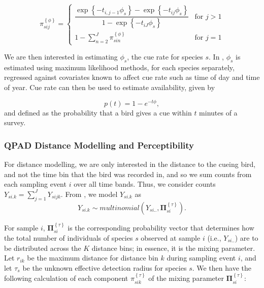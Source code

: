 \documentclass[12pt]{article}
\begin{document}
\begin{equation}\label{eq:removal}
	\pi_{sij}^{\left\{\phi\right\}} = 
	\begin{cases}
		\dfrac{\exp\left\{ -t_{i,j-1}\phi_{s} \right\} - \exp\left\{ -t_{ij}\phi_{s} \right\}}{1 - \exp\left\{ -t_{iJ}\phi_{s} \right\}} & \text{for } j > 1 \\
		1 - \sum_{n = 2}^{J} \pi_{sin}^{\left\{\phi\right\}} & \text{for } j = 1
	\end{cases}
\end{equation}

\par We are then interested in estimating $\phi_s$, the cue rate for species $s$.
In \citep{solymos_calibrating_2013}, $\phi_s$ is estimated using maximum likelihood methods, for each species separately, regressed against covariates known to affect cue rate such as time of day and time of year.
Cue rate can then be used to estimate availability, given by

\begin{equation}\label{eq:availability}
	p(t) = 1 - e^{-t\phi},
\end{equation}
and defined as the probability that a bird gives a cue within $t$ minutes of a survey.

\subsubsection{QPAD Distance Modelling and Perceptibility}

\par For distance modelling, we are only interested in the distance to the cueing bird, and not the time bin that the bird was recorded in, and so we sum counts from each sampling event $i$ over all time bands. 
Thus, we consider counts ${Y}_{si.k} = \sum_{j=1}^{J}{Y}_{sijk}$. 
From \citet{solymos_calibrating_2013}, we model ${Y}_{si.k}$ as
$${Y}_{si.k} \sim multinomial\left({Y}_{si..}, \mathbf{\Pi}_{si}^{\left\{\tau\right\}}\right).$$

\par For sample $i$, $\mathbf{\Pi}_{si}^{\left\{\tau\right\}}$ is the corresponding probability vector that determines how the total number of individuals of species $s$ observed at sample $i$ (i.e., ${Y}_{si..}$) are to be distributed across the $K$ distance bins; in essence, it is the mixing parameter. 
Let $r_{ik}$ be the maximum distance for distance bin $k$ during sampling event $i$, and let $\tau_s$ be the unknown effective detection radius for species $s$. 
We then have the following calculation of each component $\pi_{sik}^{\left\{\tau\right\}}$ of the mixing parameter $\mathbf{\Pi}_{si}^{\left\{\tau\right\}}$:
\end{document}
